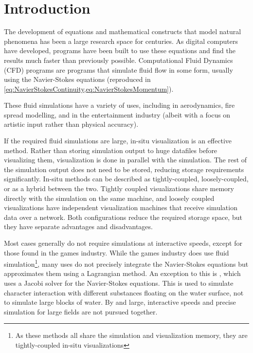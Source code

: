 
\chapter{Introduction}
\label{sec:Introduction} 
The development of equations and mathematical constructs that model natural phenomena has been a large research space for centuries.
As digital computers have developed, programs have been built to use these equations and find the results much faster than previously possible\cite{AtomicHeritageFoundationComputingProject}.
Computational Fluid Dynamics (CFD) programs are programs that simulate fluid flow in some form, usually using the Navier-Stokes equations (reproduced in \cref{eq:NavierStokesContinuity,eq:NavierStokesMomentum}).

These fluid simulations have a variety of uses,
including in aerodynamics\cite{jameson2002},%
fire spread modelling\cite{Sullivan_2009},
and in the entertainment industry (albeit with a focus on artistic input rather than physical accuracy\cite{article:FluidDynamicsOnBigScreen}).

If the required fluid simulations are large, in-situ visualization is an effective method.
Rather than storing simulation output to huge datafiles before visualizing them, visualization is done in parallel with the simulation.
The rest of the simulation output does not need to be stored, reducing storage requirements significantly.
In-situ methods can be described as tightly-coupled, loosely-coupled, or as a hybrid between the two.
Tightly coupled visualizations share memory directly with the simulation on the same machine, and loosely coupled visualizations have independent visualization machines that receive simulation data over a network.
Both configurations reduce the required storage space, but they have separate advantages and disadvantages.

Most cases generally do not require simulations at interactive speeds, except for those found in the games industry.
While the games industry does use fluid simulation\cite{paper:GameFluidSummary:medveckyreal}\footnote{As these methods all share the simulation and visualization memory, they are tightly-coupled in-situ visualizations}, many uses do not precisely integrate the Navier-Stokes equations but approximates them \cite{paper:StableFluids:10.1145/311535.311548} using a Lagrangian method.
An exception to this is \cite{presentation:RealtimeFluidSimTombRaider}, which uses a Jacobi solver for the Navier-Stokes equations. This is used to simulate character interaction with different substances floating on the water surface\cite{presentation:RealtimeFluidSimTombRaider}, not to simulate large blocks of water.
By and large, interactive speeds and precise simulation for large fields are not pursued together.

